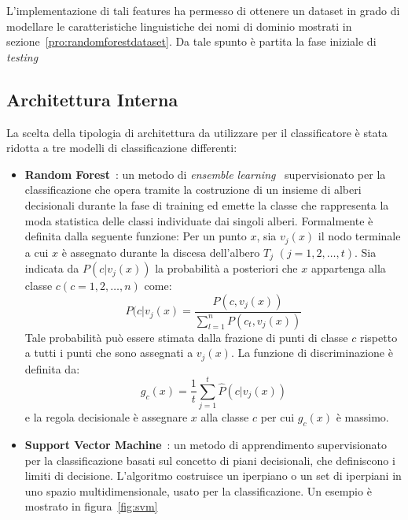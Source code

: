 L'implementazione di tali features ha permesso di ottenere un dataset in grado di modellare le caratteristiche linguistiche dei nomi di dominio mostrati in sezione~\ref{pro:randomforestdataset}. Da tale spunto è partita la fase iniziale di \textit{testing} 

\subsection{Architettura Interna}
La scelta della tipologia di architettura da utilizzare per il classificatore è stata ridotta a tre modelli di classificazione differenti: 
\begin{itemize}
\item \textbf{Random Forest}~\cite{randomforest}: un metodo di \textit{ensemble learning}~\cite{ensemble} supervisionato per la classificazione che opera tramite la costruzione di un insieme di alberi decisionali durante la fase di training ed emette la classe che rappresenta la moda statistica delle classi individuate dai singoli alberi. Formalmente è definita dalla seguente funzione:
Per un punto $x$, sia $v_j(x)$ il nodo terminale a  cui $x$ è assegnato durante la discesa dell'albero $T_j$ $\left(j=1,2,\dots,t\right)$.
Sia indicata da $P(c|v_j(x))$ la probabilità a posteriori che $x$ appartenga alla classe $c (c = 1,2,\dots,n)$ come:
\[P(c|v_j(x) = \frac{P(c,v_j(x))}{\sum_{l=1}^n P(c_t,v_j(x))}\]
Tale probabilità può essere stimata dalla frazione di punti di classe $c$ rispetto a tutti i punti che sono assegnati a $v_j(x)$. 
La funzione di discriminazione è definita da:
\[g_c(x) = \frac{1}{t}\displaystyle\sum_{j=1}^{t} \hat{P}(c|v_j(x))\]
e la regola decisionale è assegnare $x$ alla classe $c$ per cui $g_c(x)$ è massimo.

\item \textbf{Support Vector Machine}~\cite{svm}:  un metodo di apprendimento supervisionato per la classificazione basati sul concetto di piani decisionali, che definiscono i limiti di decisione. L'algoritmo costruisce un iperpiano o un set di iperpiani in uno spazio multidimensionale, usato per la classificazione. Un esempio è mostrato in figura~\ref{fig:svm}


\end{itemize}
